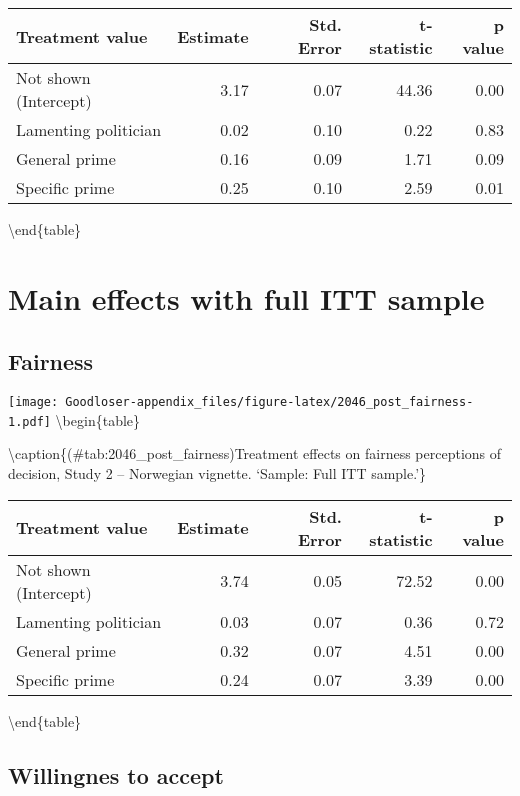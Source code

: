 \documentclass[
]{book}
\begin{document}
\begin{tabular}[t]{lrrrr}
\toprule
Treatment value & Estimate & Std. Error & t-statistic & p value\\
\midrule
Not shown (Intercept) & 3.17 & 0.07 & 44.36 & 0.00\\
Lamenting politician & 0.02 & 0.10 & 0.22 & 0.83\\
General prime & 0.16 & 0.09 & 1.71 & 0.09\\
Specific prime & 0.25 & 0.10 & 2.59 & 0.01\\
\bottomrule
\end{tabular}

\textbackslash end\{table\}

\hypertarget{main-effects-with-full-itt-sample}{%
\chapter{Main effects with full ITT sample}\label{main-effects-with-full-itt-sample}}

\hypertarget{fairness-4}{%
\section{Fairness}\label{fairness-4}}

\texttt{[image: Goodloser-appendix\_files/figure-latex/2046\_post\_fairness-1.pdf]} \textbackslash begin\{table\}

\textbackslash caption\{(\#tab:2046\_post\_fairness)Treatment effects on fairness perceptions of decision, Study 2 -- Norwegian vignette. `Sample: Full ITT sample.'\}
\centering

\begin{tabular}[t]{lrrrr}
\toprule
Treatment value & Estimate & Std. Error & t-statistic & p value\\
\midrule
Not shown (Intercept) & 3.74 & 0.05 & 72.52 & 0.00\\
Lamenting politician & 0.03 & 0.07 & 0.36 & 0.72\\
General prime & 0.32 & 0.07 & 4.51 & 0.00\\
Specific prime & 0.24 & 0.07 & 3.39 & 0.00\\
\bottomrule
\end{tabular}

\textbackslash end\{table\}

\hypertarget{willingnes-to-accept-2}{%
\section{Willingnes to accept}\label{willingnes-to-accept-2}}
\end{document}
